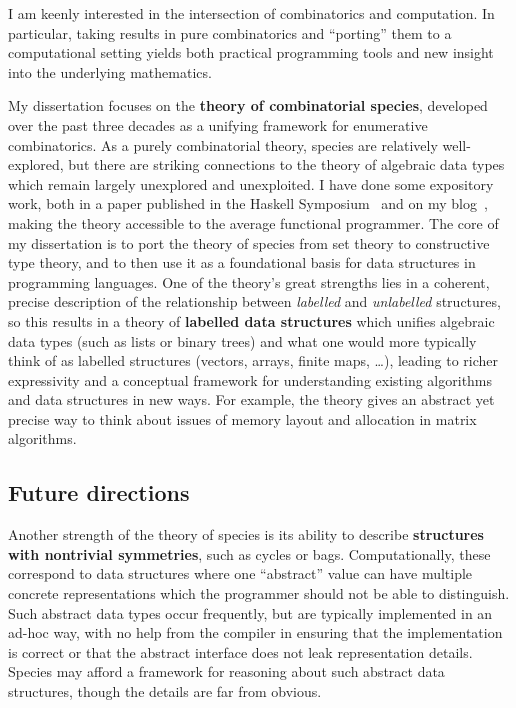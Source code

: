 \documentclass[12pt]{article}
\begin{document}
I am keenly interested in the intersection of combinatorics and
computation.  In particular, taking results in pure combinatorics and
``porting'' them to a computational setting yields both practical
programming tools and new insight into the underlying mathematics.

My dissertation focuses on the \textbf{theory of
  combinatorial species}, developed over the past three decades as a
unifying framework for enumerative combinatorics. As a purely
combinatorial theory, species are relatively well-explored, but there
are striking connections to the theory of algebraic data types which
remain largely unexplored and unexploited. I have done some
expository work, both in a paper published in the Haskell
Symposium~\cite{yorgey2010species} and on my blog~\cite{blog}, making the
theory accessible to the average functional programmer.  The core of
my dissertation is to port the theory of species from set theory to
constructive type theory, and to then use it as a foundational basis
for data structures in programming languages. One of the theory's
great strengths lies in a coherent, precise description of the
relationship between \emph{labelled} and \emph{unlabelled} structures,
so this results in a theory of \textbf{labelled data structures} which
unifies algebraic data types (such as lists or binary trees) and what
one would more typically think of as labelled structures (vectors,
arrays, finite maps, \dots), leading to richer expressivity and a
conceptual framework for understanding existing algorithms and data
structures in new ways.  For example, the theory gives an abstract yet
precise way to think about issues of memory layout and allocation in
matrix algorithms.

\subsection*{Future directions}

Another strength of the theory of species is its ability to describe
\textbf{structures with nontrivial symmetries}, such as cycles or
bags.  Computationally, these correspond to data structures where one
``abstract'' value can have multiple concrete representations which
the programmer should not be able to distinguish.  Such abstract data
types occur frequently, but are typically implemented in an ad-hoc
way, with no help from the compiler in ensuring that the
implementation is correct or that the abstract interface does not leak
representation details.  Species may afford a framework for reasoning
about such abstract data structures, though the details are far from
obvious.
\end{document}

